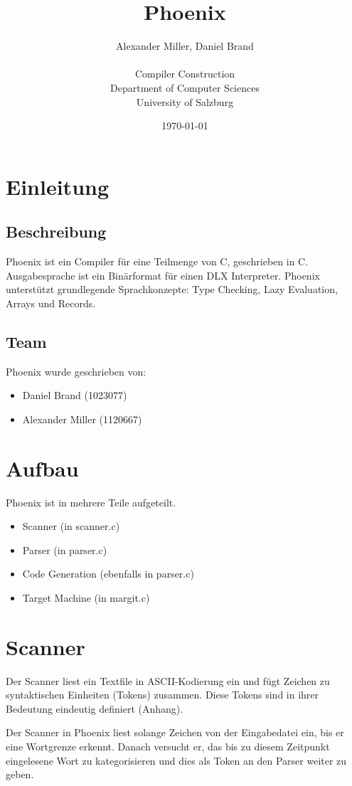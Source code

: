 \documentclass{article}
\title{Phoenix}
\author{Alexander Miller, Daniel Brand \\ \\
		Compiler Construction \\
		Department of Computer Sciences \\
		University of Salzburg}
\date{\today}
\begin{document}
	\maketitle
	\tableofcontents

	\section{Einleitung}
	\subsection{Beschreibung}
	Phoenix ist ein Compiler für eine Teilmenge von C, geschrieben in C.
	Ausgabesprache ist ein Binärformat für einen DLX Interpreter.
	Phoenix unterstützt grundlegende Sprachkonzepte: Type Checking, Lazy Evaluation, Arrays und Records.

	\subsection{Team}
	Phoenix wurde geschrieben von:
	\begin{itemize}
		\item Daniel Brand (1023077)
		\item Alexander Miller (1120667)
	\end{itemize}

	\section{Aufbau}
	Phoenix ist in mehrere Teile aufgeteilt.
	\begin{itemize}
		\item Scanner (in scanner.c)
		\item Parser (in parser.c)
		\item Code Generation (ebenfalls in parser.c)
		\item Target Machine (in margit.c)
	\end{itemize}


	\section{Scanner}
	Der Scanner liest ein Textfile in ASCII-Kodierung ein und fügt Zeichen zu syntaktischen Einheiten (Tokens) zusammen.
	Diese Tokens sind in ihrer Bedeutung eindeutig definiert (Anhang).

	Der Scanner in Phoenix liest solange Zeichen von der Eingabedatei ein, bis er eine Wortgrenze erkennt.
	Danach versucht er, das bis zu diesem Zeitpunkt eingelesene Wort zu kategorisieren und dies als Token an den Parser weiter zu geben.
\end{document}
